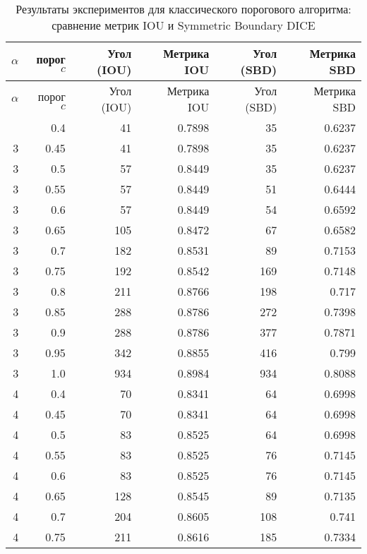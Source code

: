 
\begin{center}
\begin{longtable}{|r|r|r|r|r|r|}
\caption{Результаты экспериментов для классического порогового алгоритма: сравнение метрик IOU и Symmetric Boundary DICE} 
\label{tab:classic-thresholding} \\
\hline
\(\alpha\) & порог \(c\) & Угол (IOU) & Метрика IOU & Угол (SBD) & Метрика SBD \\
\hline
\endfirsthead

\hline
\(\alpha\) & порог \(c\) & Угол (IOU) & Метрика IOU & Угол (SBD) & Метрика SBD \\
\hline
\endhead

\hline
\endfoot

\hline
\endlastfoot
3 & 0.4 & 41 & 0.7898 & 35 & 0.6237 \\
\hline
3 & 0.45 & 41 & 0.7898 & 35 & 0.6237 \\
\hline
3 & 0.5 & 57 & 0.8449 & 35 & 0.6237 \\
\hline
3 & 0.55 & 57 & 0.8449 & 51 & 0.6444 \\
\hline
3 & 0.6 & 57 & 0.8449 & 54 & 0.6592 \\
\hline
3 & 0.65 & 105 & 0.8472 & 67 & 0.6582 \\
\hline
3 & 0.7 & 182 & 0.8531 & 89 & 0.7153 \\
\hline
3 & 0.75 & 192 & 0.8542 & 169 & 0.7148 \\
\hline
3 & 0.8 & 211 & 0.8766 & 198 & 0.717 \\
\hline
3 & 0.85 & 288 & 0.8786 & 272 & 0.7398 \\
\hline
3 & 0.9 & 288 & 0.8786 & 377 & 0.7871 \\
\hline
3 & 0.95 & 342 & 0.8855 & 416 & 0.799 \\
\hline
3 & 1.0 & 934 & 0.8984 & 934 & 0.8088 \\
\hline
4 & 0.4 & 70 & 0.8341 & 64 & 0.6998 \\
\hline
4 & 0.45 & 70 & 0.8341 & 64 & 0.6998 \\
\hline
4 & 0.5 & 83 & 0.8525 & 64 & 0.6998 \\
\hline
4 & 0.55 & 83 & 0.8525 & 76 & 0.7145 \\
\hline
4 & 0.6 & 83 & 0.8525 & 76 & 0.7145 \\
\hline
4 & 0.65 & 128 & 0.8545 & 89 & 0.7135 \\
\hline
4 & 0.7 & 204 & 0.8605 & 108 & 0.741 \\
\hline
4 & 0.75 & 211 & 0.8616 & 185 & 0.7334 \\

\end{longtable}
\end{center}

